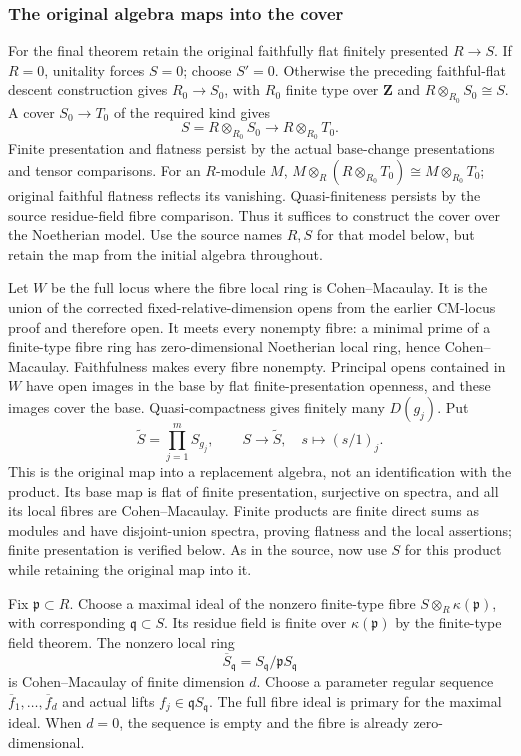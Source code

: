 \subsubsection{The original algebra maps into the cover}\label{the-original-algebra-maps-into-the-cover}

For the final theorem retain the original faithfully flat finitely presented \(R\to S\). If \(R=0\), unitality forces \(S=0\); choose \(S'=0\). Otherwise the preceding faithful-flat descent construction gives \(R_0\to S_0\), with \(R_0\) finite type over \(\mathbf Z\) and \(R\otimes_{R_0}S_0\cong S\). A cover \(S_0\to T_0\) of the required kind gives \[
S=R\otimes_{R_0}S_0\longrightarrow R\otimes_{R_0}T_0.
\] Finite presentation and flatness persist by the actual base-change presentations and tensor comparisons. For an \(R\)-module \(M\), \(M\otimes_R(R\otimes_{R_0}T_0)\cong M\otimes_{R_0}T_0\); original faithful flatness reflects its vanishing. Quasi-finiteness persists by the source residue-field fibre comparison. Thus it suffices to construct the cover over the Noetherian model. Use the source names \(R,S\) for that model below, but retain the map from the initial algebra throughout.

Let \(W\) be the full locus where the fibre local ring is Cohen--Macaulay. It is the union of the corrected fixed-relative-dimension opens from the earlier CM-locus proof and therefore open. It meets every nonempty fibre: a minimal prime of a finite-type fibre ring has zero-dimensional Noetherian local ring, hence Cohen--Macaulay. Faithfulness makes every fibre nonempty. Principal opens contained in \(W\) have open images in the base by flat finite-presentation openness, and these images cover the base. Quasi-compactness gives finitely many \(D(g_j)\). Put \[
\widetilde S=\prod_{j=1}^m S_{g_j},\qquad
S\longrightarrow\widetilde S,\quad s\longmapsto(s/1)_j.
\] This is the original map into a replacement algebra, not an identification with the product. Its base map is flat of finite presentation, surjective on spectra, and all its local fibres are Cohen--Macaulay. Finite products are finite direct sums as modules and have disjoint-union spectra, proving flatness and the local assertions; finite presentation is verified below. As in the source, now use \(S\) for this product while retaining the original map into it.

Fix \(\mathfrak p\subset R\). Choose a maximal ideal of the nonzero finite-type fibre \(S\otimes_R\kappa(\mathfrak p)\), with corresponding \(\mathfrak q\subset S\). Its residue field is finite over \(\kappa(\mathfrak p)\) by the finite-type field theorem. The nonzero local ring \[
\overline S_{\mathfrak q}=S_{\mathfrak q}/\mathfrak pS_{\mathfrak q}
\] is Cohen--Macaulay of finite dimension \(d\). Choose a parameter regular sequence \(\overline f_1,\ldots,\overline f_d\) and actual lifts \(f_j\in\mathfrak q S_{\mathfrak q}\). The full fibre ideal is primary for the maximal ideal. When \(d=0\), the sequence is empty and the fibre is already zero-dimensional.


